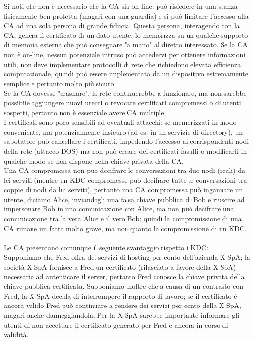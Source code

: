 Si noti che non è necessario che la CA sia on-line: può risiedere in una stanza fisicamente ben protetta (magari con una guardia) e si può limitare l'accesso alla CA ad una sola persona di grande fiducia. Questa persona, interagendo con la CA, genera il certificato di un dato utente, lo memorizza su un qualche supporto di memoria esterna che può consegnare "a mano" al diretto interessato. Se la CA non è on-line, nessun potenziale intruso può accedervi per ottenere informazioni utili, non deve implementare protocolli di rete che richiedono elevata efficienza computazionale, quindi può essere implementata da un dispositivo estremamente semplice e pertanto molto più sicuro.\\ 
Se la CA dovesse "crashare", la rete continuerebbe a funzionare, ma non sarebbe possibile aggiungere nuovi utenti o
revocare certificati compromessi o di utenti sospetti, pertanto non è essenziale avere CA multiple. \\
I certificati sono poco sensibili ad eventuali attacchi: se memorizzati in modo conveniente, ma potenzialmente
insicuro (ad es. in un servizio di directory), un sabotatore può cancellare i certificati, impedendo l’accesso ai corrispondenti nodi della rete (attacco DOS) ma non può creare dei certificati fasulli o modificarli in qualche modo se non dispone della chiave privata della CA.\\
Una CA compromessa non puo decifrare le conversazioni tra due nodi (reali) da lei serviti (mentre un KDC compromesso può decifrare tutte le conversazioni tra coppie di nodi da lui serviti), pertanto una CA compromessa può ingannare un utente, diciamo Alice, inviandogli una falsa chiave pubblica di Bob e riuscire ad impersonare Bob in una comunicazione con Alice, ma non può decifrare una comunicazione tra la vera Alice e il vero Bob: quindi la compromissione di una CA rimane un fatto molto grave, ma non quanto la compromissione di un KDC. \\ \\
Le CA presentano comunque il seguente svantaggio rispetto i KDC: \\
Supponiamo che Fred offra dei servizi di hosting per conto dell'azienda X SpA; la società X SpA fornisce a Fred un certificato (rilasciato a favore della X SpA) necessario ad autenticare il server, pertanto Fred conosce la chiave privata della chiave pubblica certificata. Supponiamo inoltre che a causa di un contrasto con Fred, la X SpA decida di interrompere il rapporto di lavoro; se il certificato è ancora valido Fred può continuare a rendere dei servizi per conto della X SpA, magari anche danneggiandola. Per la X SpA sarebbe importante informare gli utenti di non accettare il certificato generato per Fred e ancora in corso di validità. \\
